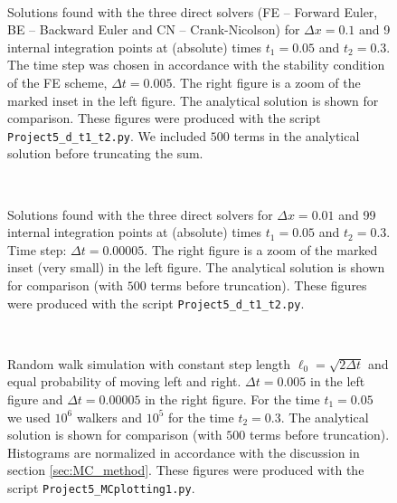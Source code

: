 \documentclass[a4paper, 11pt, notitlepage,english]{article}
\begin{document}
\begin{figure}[h!tb]
 \centering
 \mbox{\quad
 }
 \caption{Solutions found with the three direct solvers (FE – Forward Euler, BE – Backward Euler and CN – Crank-Nicolson) for $\Delta x = 0.1$ and 9 internal integration points at (absolute) times $t_1 = 0.05$ and $t_2 = 0.3$. The time step was chosen in accordance with the stability condition of the FE scheme, $\Delta t = 0.005$. The right figure is a zoom of the marked inset in the left figure. The analytical solution is shown for comparison. These figures were produced with the script \texttt{Project5\_d\_t1\_t2.py}. We included $500$ terms in the analytical solution before truncating the sum.}
\label{fig:Three_methods10}
\end{figure}

\begin{figure}[h!tb]
 \centering
 \mbox{\quad
 }
 \caption{Solutions found with the three direct solvers for $\Delta x = 0.01$ and 99 internal integration points at (absolute) times $t_1 = 0.05$ and $t_2 = 0.3$. Time step: $\Delta t = 0.00005$. The right figure is a zoom of the marked inset (very small) in the left figure. The analytical solution is shown for comparison (with $500$ terms before truncation). These figures were produced with the script \texttt{Project5\_d\_t1\_t2.py}.}
\label{fig:Three_methods100}
\end{figure}

\begin{figure}[h!tb]
 \centering
 \mbox{\quad
 }
 \caption{Random walk simulation with constant step length $\ell_0 = \sqrt{2\Delta t}$ and equal probability of moving left and right. $\Delta t = 0.005$ in the left figure and $\Delta t = 0.00005$ in the right figure. For the time $t_1 = 0.05$ we used $10^6$ walkers and $10^5$ for the time $t_2 = 0.3$. The analytical solution is shown for comparison (with $500$ terms before truncation). Histograms are normalized in accordance with the discussion in section \ref{sec:MC_method}. These figures were produced with the script \texttt{Project5\_MCplotting1.py}.}
\label{fig:MC_uniform}
\end{figure}
\end{document}
